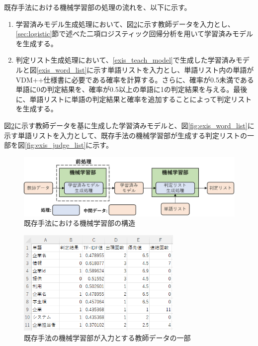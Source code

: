 既存手法における機械学習部の処理の流れを、以下に示す。

\begin{enumerate}
    \item 学習済みモデル生成処理において、図\ref{fig:exis_teach}に示す教師データを入力とし、\ref{sec:logistic}節で述べた二項ロジスティック回帰分析を用いて学習済みモデルを生成する。
    \label{exis_teach_model}
    \item 判定リスト生成処理において、\ref{exis_teach_model}で生成した学習済みモデルと図\ref{exis_word_list}に示す単語リストを入力とし、単語リスト内の単語がVDM++仕様書に必要である確率を計算する。さらに、確率が0.5未満である単語に0の判定結果を、確率が0.5以上の単語に1の判定結果を与える。最後に、単語リストに単語の判定結果と確率を追加することによって判定リストを生成する。
\end{enumerate}

図\ref{fig:exis_teach}に示す教師データを基に生成した学習済みモデルと、図\ref{fig:exis_word_list}に示す単語リストを入力として、既存手法の機械学習部が生成する判定リストの一部を図\ref{fig:exis_judge_list}に示す。

\begin{figure}[tp]
    \begin{center}
        \includegraphics[width=1.0\columnwidth]{image/exis_machine_structure.png}
        \caption{既存手法における機械学習部の構造}
        \label{fig:exis_machine_structure}
    \end{center}
\end{figure}

\begin{figure}[tp]
    \begin{center}
        \includegraphics[width=300]{image/exis_teach.png}
        \caption{既存手法の機械学習部が入力とする教師データの一部}
        \label{fig:exis_teach}
    \end{center}
\end{figure}

